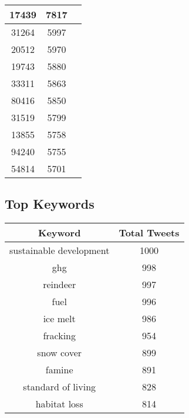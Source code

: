 \documentclass{article}\usepackage[T1]{fontenc}
\begin{document}
\begin{tabular}{|c|c|c|}
 \hline
17439 & 7817\\ 
 \hline
31264 & 5997\\ 
 \hline
20512 & 5970\\ 
 \hline
19743 & 5880\\ 
 \hline
33311 & 5863\\ 
 \hline
80416 & 5850\\ 
 \hline
31519 & 5799\\ 
 \hline
13855 & 5758\\ 
 \hline
94240 & 5755\\ 
 \hline
54814 & 5701\\ 
 \hline
\end{tabular}\subsection*{Top Keywords}\begin{tabular}{|c|c|}         \hline         Keyword & Total Tweets \\ 
 \hline
sustainable development & 1000\\ 
 \hline
ghg & 998\\ 
 \hline
reindeer & 997\\ 
 \hline
fuel & 996\\ 
 \hline
ice melt & 986\\ 
 \hline
fracking & 954\\ 
 \hline
snow cover & 899\\ 
 \hline
famine & 891\\ 
 \hline
standard of living & 828\\ 
 \hline
habitat loss & 814\\ 
 \hline
\end{tabular}
\end{document}

